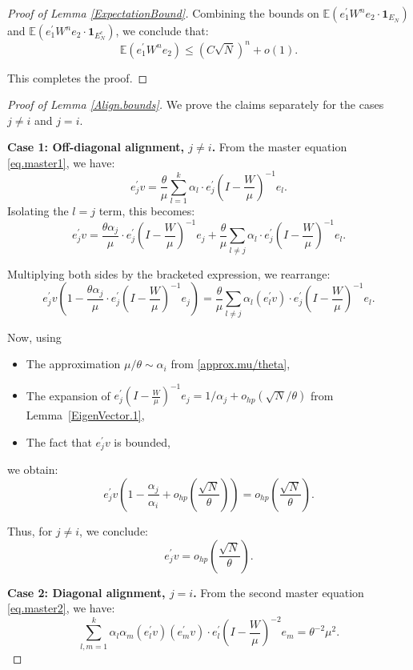 \documentclass[11pt, reqno]{amsart}
\numberwithin{equation}{section}
\begin{document}
\begin{proof}[Proof of Lemma \ref{ExpectationBound}]
Combining the bounds on \( \mathbb{E}(e_1^\prime W^n e_2 \cdot \mathbf{1}_{E_N}) \) and \( \mathbb{E}(e_1^\prime W^n e_2 \cdot \mathbf{1}_{E_N^c}) \), we conclude that:
\[
\mathbb{E}(e_1^\prime W^n e_2) \le (C\sqrt{N})^n + o(1).
\]

This completes the proof.
\end{proof}



\begin{proof}[Proof of Lemma \ref{Align.bounds}]
We prove the claims separately for the cases \( j \ne i \) and \( j = i \).

\smallskip
\noindent\textbf{Case 1: Off-diagonal alignment, \( j \ne i \).}  
From the master equation \eqref{eq.master1}, we have:
\[
e_j^\prime v = \frac{\theta}{\mu} \sum_{l=1}^{k} \alpha_l \cdot e_j^\prime \left(I - \frac{W}{\mu}\right)^{-1} e_l.
\]
Isolating the \( l = j \) term, this becomes:
\[
e_j^\prime v = \frac{\theta \alpha_j}{\mu} \cdot e_j^\prime \left(I - \frac{W}{\mu}\right)^{-1} e_j + \frac{\theta}{\mu} \sum_{l \ne j} \alpha_l \cdot e_j^\prime \left(I - \frac{W}{\mu}\right)^{-1} e_l.
\]

Multiplying both sides by the bracketed expression, we rearrange:
\[
e_j^\prime v \left(1 - \frac{\theta \alpha_j}{\mu} \cdot e_j^\prime \left(I - \frac{W}{\mu}\right)^{-1} e_j \right) 
= \frac{\theta}{\mu} \sum_{l \ne j} \alpha_l (e_l^\prime v) \cdot e_j^\prime \left(I - \frac{W}{\mu}\right)^{-1} e_l.
\]

Now, using
\begin{itemize}
\item[(a)]The approximation \( \mu/\theta \sim \alpha_i \) from \eqref{approx.mu/theta},
\item[(b)] The expansion of \( e_j^\prime \left(I - \frac{W}{\mu} \right)^{-1} e_j = 1/\alpha_j + o_{hp}(\sqrt{N}/\theta) \) from Lemma~\ref{EigenVector.1},
\item[(c)] The fact that \( e_j^\prime v \) is bounded,
\end{itemize}
we obtain:
\begin{equation} \label{align.ortho.final}
e_j^\prime v \left( 1 - \frac{\alpha_j}{\alpha_i} + o_{hp}\left( \frac{\sqrt{N}}{\theta} \right) \right) 
= o_{hp}\left( \frac{\sqrt{N}}{\theta} \right).
\end{equation}

Thus, for \( j \ne i \), we conclude:
\[
e_j^\prime v = o_{hp}\left( \frac{\sqrt{N}}{\theta} \right).
\]

\smallskip
\noindent\textbf{Case 2: Diagonal alignment, \( j = i \).}  
From the second master equation \eqref{eq.master2}, we have:
\[
\sum_{l,m=1}^k \alpha_l \alpha_m (e_l^\prime v)(e_m^\prime v) \cdot e_l^\prime \left(I - \frac{W}{\mu}\right)^{-2} e_m = \theta^{-2} \mu^2.
\]


\end{proof}
\end{document}
